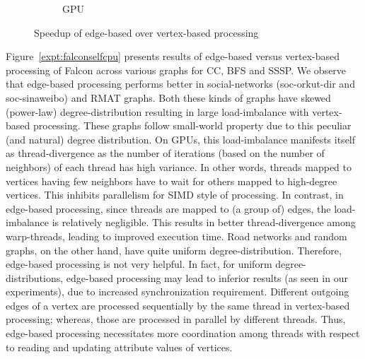 \begin{figure}
\begin{subfigure}{0.45\textwidth}
    \caption{GPU}
    \label{expt:falconselfgpu}
  \end{subfigure}
\caption{Speedup of edge-based over vertex-based processing}
\label{expt:edgevertex}
\end{figure}


Figure~\ref{expt:falconselfcpu} presents results of edge-based versus vertex-based processing of Falcon across various graphs for CC, BFS and SSSP. 
We observe that edge-based processing performs better in social-networks (soc-orkut-dir and soc-sinaweibo) and RMAT graphs. 
Both these kinds of graphs have skewed (power-law) degree-distribution resulting in large load-imbalance with vertex-based processing.
These graphs follow small-world property due to this peculiar (and natural) degree distribution.
On GPUs, this load-imbalance manifests itself as thread-divergence as the number of iterations (based on the number of neighbors) of each thread has high variance.
In other words, threads mapped to vertices having few neighbors have to wait for others mapped to high-degree vertices. 
This inhibits parallelism for SIMD style of processing.
In contrast, in edge-based processing, since threads are mapped to (a group of) edges, the load-imbalance is relatively negligible.
This results in better thread-divergence among warp-threads, leading to improved execution time.
Road networks and random graphs, on the other hand, have quite uniform degree-distribution.
Therefore, edge-based processing is not very helpful.
In fact, for uniform degree-distributions, edge-based processing may lead to inferior results (as seen in our experiments), due to increased synchronization requirement. %
Different outgoing edges of a vertex are processed sequentially by the same thread in vertex-based processing; whereas, those are processed in parallel by different threads.
Thus, edge-based processing necessitates more coordination among threads with respect to reading and updating attribute values of vertices.

